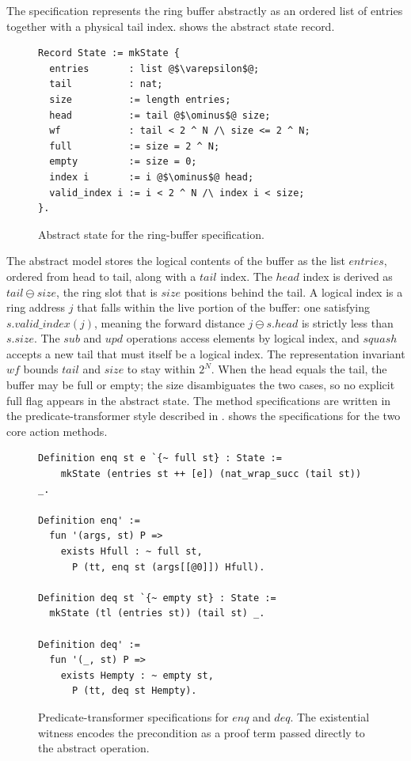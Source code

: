 \documentclass[fontset=fira-newtxsf]{mitthesis}
\theoremstyle{definition}
\theoremstyle{plain}
\begin{document}
The specification represents the ring buffer abstractly as an ordered list of entries together with a physical tail index.
 shows the abstract state record.

\begin{figure}[ht]
\begin{verbatim}
Record State := mkState {
  entries       : list @$\varepsilon$@;
  tail          : nat;
  size          := length entries;
  head          := tail @$\ominus$@ size;
  wf            : tail < 2 ^ N /\ size <= 2 ^ N;
  full          := size = 2 ^ N;
  empty         := size = 0;
  index i       := i @$\ominus$@ head;
  valid_index i := i < 2 ^ N /\ index i < size;
}.
\end{verbatim}
\caption[Ring-buffer abstract state]{Abstract state for the ring-buffer specification.}
\label{fig:rb-spec-state}
\end{figure}

The abstract model stores the logical contents of the buffer as the list $\mathit{entries}$, ordered from head to tail, along with a $\mathit{tail}$ index.
The $\mathit{head}$ index is derived as $\mathit{tail} \ominus \mathit{size}$, the ring slot that is $\mathit{size}$ positions behind the tail.
A logical index is a ring address $j$ that falls within the live portion of the buffer: one satisfying $s.\mathit{valid\_index}(j)$, meaning the forward distance $j \ominus s.\mathit{head}$ is strictly less than $s.\mathit{size}$.
The $\mathit{sub}$ and $\mathit{upd}$ operations access elements by logical index, and $\mathit{squash}$ accepts a new tail that must itself be a logical index.
The representation invariant $\mathit{wf}$ bounds $\mathit{tail}$ and $\mathit{size}$ to stay within $2^{N}$.
When the head equals the tail, the buffer may be full or empty; the size disambiguates the two cases, so no explicit full flag appears in the abstract state.
The method specifications are written in the predicate-transformer style described in .
 shows the specifications for the two core action methods.

\begin{figure}[ht]
\begin{verbatim}
Definition enq st e `{~ full st} : State :=
    mkState (entries st ++ [e]) (nat_wrap_succ (tail st)) _.

Definition enq' :=
  fun '(args, st) P =>
    exists Hfull : ~ full st,
      P (tt, enq st (args[[@0]]) Hfull).

Definition deq st `{~ empty st} : State :=
  mkState (tl (entries st)) (tail st) _.

Definition deq' :=
  fun '(_, st) P =>
    exists Hempty : ~ empty st,
      P (tt, deq st Hempty).
\end{verbatim}
\caption[Ring-buffer specifications]{Predicate-transformer specifications for $\mathit{enq}$ and $\mathit{deq}$. The existential witness encodes the precondition as a proof term passed directly to the abstract operation.}
\label{fig:rb-spec-methods}
\end{figure}
\end{document}
